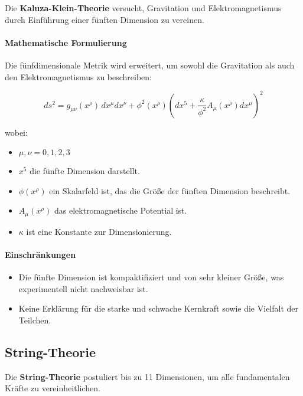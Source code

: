 \documentclass[11pt,a4paper]{article}
\begin{document}
Die \textbf{Kaluza-Klein-Theorie} versucht, Gravitation und Elektromagnetismus durch Einführung einer fünften Dimension zu vereinen.

\paragraph{Mathematische Formulierung}

Die fünfdimensionale Metrik wird erweitert, um sowohl die Gravitation als auch den Elektromagnetismus zu beschreiben:

\begin{equation}
ds^2 = g_{\mu\nu}(x^\rho) \, dx^\mu dx^\nu + \phi^2(x^\rho) \left( dx^5 + \frac{\kappa}{\phi^2} A_\mu(x^\rho) dx^\mu \right)^2
\end{equation}

wobei:

\begin{itemize}
    \item $\mu, \nu = 0,1,2,3$
    \item $x^5$ die fünfte Dimension darstellt.
    \item $\phi(x^\rho)$ ein Skalarfeld ist, das die Größe der fünften Dimension beschreibt.
    \item $A_\mu(x^\rho)$ das elektromagnetische Potential ist.
    \item $\kappa$ ist eine Konstante zur Dimensionierung.
\end{itemize}

\paragraph{Einschränkungen}

\begin{itemize}
    \item Die fünfte Dimension ist kompaktifiziert und von sehr kleiner Größe, was experimentell nicht nachweisbar ist.
    \item Keine Erklärung für die starke und schwache Kernkraft sowie die Vielfalt der Teilchen.
\end{itemize}

\subsection{String-Theorie}

Die \textbf{String-Theorie} postuliert bis zu 11 Dimensionen, um alle fundamentalen Kräfte zu vereinheitlichen.
\end{document}
